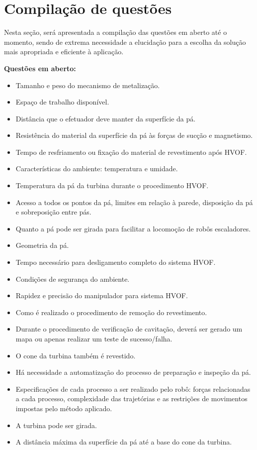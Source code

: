\section{Compilação de questões}\label{sec:questoes}
Nesta seção, será apresentada a compilação das questões em aberto até o momento,
sendo de extrema necessidade a elucidação para a escolha da solução mais
apropriada e eficiente à aplicação.

\textbf{Questões em aberto:}
\begin{itemize}
	\item Tamanho e peso do mecanismo de metalização. 
	\item Espaço de trabalho disponível.
	\item Distância que o efetuador deve manter da superfície da pá.
	\item Resistência do material da superfície da pá às forças de sucção e
	magnetismo.
	\item Tempo de resfriamento ou fixação do material de revestimento após HVOF.
	\item Características do ambiente: temperatura e umidade.
	\item Temperatura da pá da turbina durante o procedimento HVOF.
	\item Acesso a todos os pontos da pá, limites em relação à parede, disposição
	da pá e sobreposição entre pás.
	\item Quanto a pá pode ser girada para facilitar a locomoção de robôs
	escaladores.
	\item Geometria da pá.
	\item Tempo necessário para desligamento completo do sistema HVOF.
	\item Condições de segurança do ambiente.
	\item Rapidez e precisão do manipulador para sistema HVOF.
	\item Como é realizado o procedimento de remoção do revestimento.
	\item Durante o procedimento de verificação de cavitação, deverá ser gerado um
	mapa ou apenas realizar um teste de sucesso/falha.
	\item O cone da turbina também é revestido.
	\item Há necessidade a automatização do processo de preparação e
inspeção da pá.
	\item Especificações de cada processo a ser realizado pelo robô: forças
	relacionadas a cada processo, complexidade das trajetórias e as restrições de movimentos impostas pelo método aplicado.
	\item A turbina pode ser girada.
	\item A distância máxima da superfície da pá até a base do cone da turbina.
\end{itemize}


